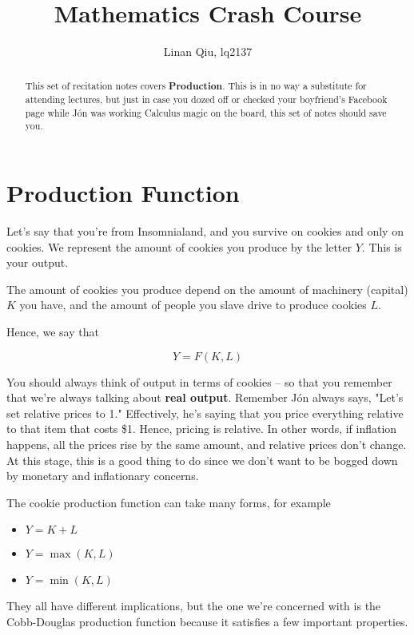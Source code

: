 \documentclass[11pt]{scrartcl}
\title{Mathematics Crash Course}
\author{Linan Qiu, lq2137}
\newcommand{\jon}{Jón }
\begin{document}
\maketitle

\begin{abstract}
This set of recitation notes covers \textbf{Production}. This is in no way a substitute for attending lectures, but just in case you dozed off or checked your boyfriend's Facebook page while \jon was working Calculus magic on the board, this set of notes should save you.
\end{abstract}

\section{Production Function}

Let's say that you're from Insomnialand, and you survive on cookies and only on cookies. We represent the amount of cookies you produce by the letter $Y$. This is your output.

The amount of cookies you produce depend on the amount of machinery (capital) $K$ you have, and the amount of people you slave drive to produce cookies $L$. 

Hence, we say that 

\[Y = F(K,L) \]

You should always think of output in terms of cookies -- so that you remember that we're always talking about \textbf{real output}. Remember \jon always says, "Let's set relative prices to 1." Effectively, he's saying that you price everything relative to that item that costs \$1. Hence, pricing is relative. In other words, if inflation happens, all the prices rise by the same amount, and relative prices don't change. At this stage, this is a good thing to do since we don't want to be bogged down by monetary and inflationary concerns.

The cookie production function can take many forms, for example

\begin{itemize}
	\item $Y = K + L$
	\item $Y = \max (K,L)$
	\item $Y = \min (K,L)$
\end{itemize}

They all have different implications, but the one we're concerned with is the Cobb-Douglas production function because it satisfies a few important properties.
\end{document}
